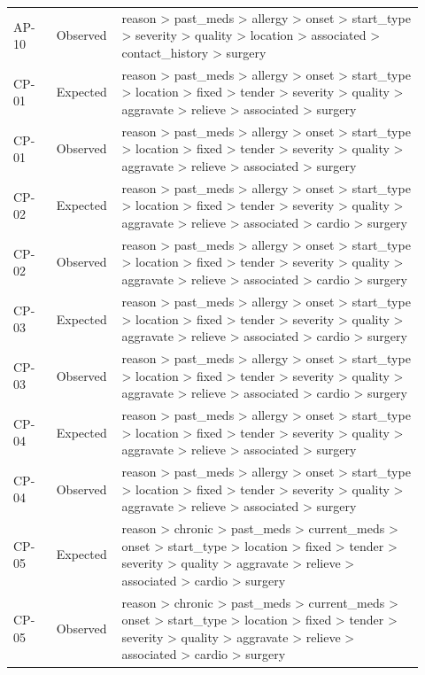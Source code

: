\begin{longtable}{>{\raggedright\arraybackslash}p{0.1\linewidth}>{\raggedright\arraybackslash}p{0.12\linewidth}>{\raggedright\arraybackslash}p{0.7\linewidth}}
AP-\allowbreak{}10 & Observed & reason > past\_\allowbreak{}meds > allergy > onset > start\_\allowbreak{}type > severity > quality > location > associated > contact\_\allowbreak{}history > surgery \\
CP-\allowbreak{}01 & Expected & reason > past\_\allowbreak{}meds > allergy > onset > start\_\allowbreak{}type > location > fixed > tender > severity > quality > aggravate > relieve > associated > surgery \\
CP-\allowbreak{}01 & Observed & reason > past\_\allowbreak{}meds > allergy > onset > start\_\allowbreak{}type > location > fixed > tender > severity > quality > aggravate > relieve > associated > surgery \\
CP-\allowbreak{}02 & Expected & reason > past\_\allowbreak{}meds > allergy > onset > start\_\allowbreak{}type > location > fixed > tender > severity > quality > aggravate > relieve > associated > cardio > surgery \\
CP-\allowbreak{}02 & Observed & reason > past\_\allowbreak{}meds > allergy > onset > start\_\allowbreak{}type > location > fixed > tender > severity > quality > aggravate > relieve > associated > cardio > surgery \\
CP-\allowbreak{}03 & Expected & reason > past\_\allowbreak{}meds > allergy > onset > start\_\allowbreak{}type > location > fixed > tender > severity > quality > aggravate > relieve > associated > cardio > surgery \\
CP-\allowbreak{}03 & Observed & reason > past\_\allowbreak{}meds > allergy > onset > start\_\allowbreak{}type > location > fixed > tender > severity > quality > aggravate > relieve > associated > cardio > surgery \\
CP-\allowbreak{}04 & Expected & reason > past\_\allowbreak{}meds > allergy > onset > start\_\allowbreak{}type > location > fixed > tender > severity > quality > aggravate > relieve > associated > surgery \\
CP-\allowbreak{}04 & Observed & reason > past\_\allowbreak{}meds > allergy > onset > start\_\allowbreak{}type > location > fixed > tender > severity > quality > aggravate > relieve > associated > surgery \\
CP-\allowbreak{}05 & Expected & reason > chronic > past\_\allowbreak{}meds > current\_\allowbreak{}meds > onset > start\_\allowbreak{}type > location > fixed > tender > severity > quality > aggravate > relieve > associated > cardio > surgery \\
CP-\allowbreak{}05 & Observed & reason > chronic > past\_\allowbreak{}meds > current\_\allowbreak{}meds > onset > start\_\allowbreak{}type > location > fixed > tender > severity > quality > aggravate > relieve > associated > cardio > surgery \\

\end{longtable}
